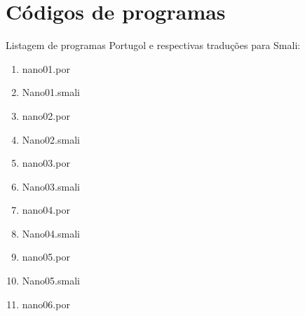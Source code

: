 \documentclass[12pt,a4paper,twoside]{report}
\begin{document}
\section{Códigos de programas}
Listagem de programas Portugol e respectivas traduções para Smali:
\begin{enumerate}
\item nano01.por


\item Nano01.smali


\item nano02.por


\item Nano02.smali


\item nano03.por


\item Nano03.smali


\item nano04.por


\item Nano04.smali


\item nano05.por


\item Nano05.smali


\item nano06.por



\end{enumerate}
\end{document}
